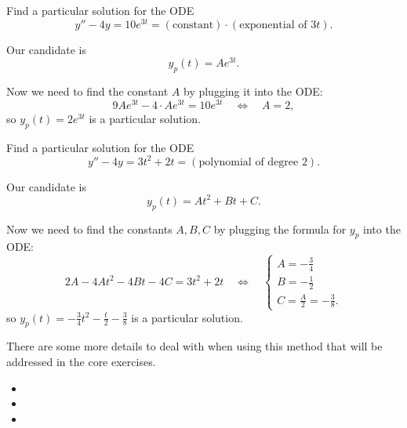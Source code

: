 \begin{example}
Find a particular solution for the ODE
$$
y''  - 4y = 10 e^{3t} = (\text{constant}) \cdot (\text{exponential of } 3t).
$$	

Our candidate is
$$
y_p(t) = A e^{3t}.
$$

Now we need to find the constant $A$ by plugging it into the ODE:
$$
9 A e^{3t} - 4 \cdot A e^{3t} = 10 e^{3t}
\quad \Leftrightarrow \quad 
	A = 2,
$$
so $y_p(t) = 2 e^{3t}$ is a particular solution.
\end{example}


\begin{example}
Find a particular solution for the ODE
$$
y''  - 4y = 3t^2+2t = (\text{polynomial of degree 2}).
$$	

Our candidate is
$$
y_p(t) = At^2 + Bt + C.
$$

Now we need to find the constants $A, B, C$ by plugging the formula for $y_p$ into the ODE:
$$
2A - 4At^2 - 4B t - 4C = 3t^2+2t
\quad \Leftrightarrow \quad 
\begin{cases}
A = -\frac34 \\
B = -\frac12 \\
C = \frac{A}{2} = -\frac38.	
\end{cases}
$$
so $y_p(t) = -\frac34 t^2 - \frac{t}{2} - \frac38$ is a particular solution.
\end{example}

There are some more details to deal with when using this method that will be addressed in the core exercises.




\begin{video}
\begin{itemize}
	\item {}
	\item {}
	\item {}
\end{itemize}	
\end{video}




